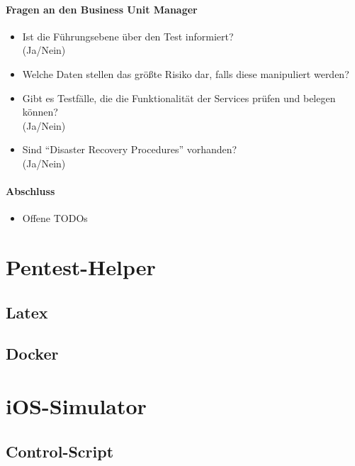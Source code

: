 \paragraph{Fragen an den Business Unit Manager}
\begin{itemize}
\item Ist die Führungsebene über den Test informiert?\\
(Ja/Nein)
\item Welche Daten stellen das größte Risiko dar, falls diese manipuliert werden?
\item Gibt es Testfälle, die die Funktionalität der Services prüfen und belegen können?\\
(Ja/Nein)
\item Sind "`Disaster Recovery Procedures"' vorhanden?\\
(Ja/Nein)
\end{itemize}

\paragraph{Abschluss}
\begin{itemize}
\item Offene TODOs
\end{itemize}

\section{Pentest-Helper}
\subsection{Latex}\label{ap:FragTex}
\lstset{language=TeX}




\subsection{Docker}\label{ap:Docker}


\section{iOS-Simulator}
\subsection{Control-Script}\label{ap:simcontrol}
\lstset{language=Python}

